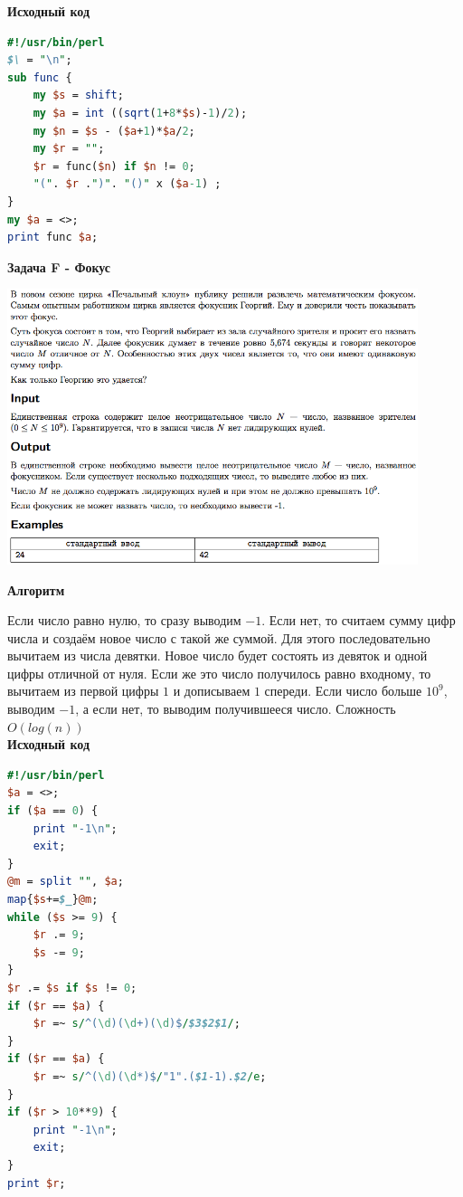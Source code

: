 \documentclass[a4paper,12pt]{article}
\begin{document}
\textbf{{\large Исходный код}} \\
\begin{lstlisting}[language=Perl]
#!/usr/bin/perl
$\ = "\n";
sub func {
	my $s = shift;
	my $a = int ((sqrt(1+8*$s)-1)/2);
	my $n = $s - ($a+1)*$a/2;
	my $r = "";
	$r = func($n) if $n != 0;
	"(". $r .")". "()" x ($a-1) ;
}
my $a = <>;
print func $a;
\end{lstlisting}

\newpage
\textbf{{\large Задача F - Фокус}}

\begin{center}
\includegraphics[width=0.9\textwidth]{OC_Ural/OC_Ural_F.png}\\ [1cm]
\end{center}
\newpage

\textbf{{\large Алгоритм}}

Если число равно нулю, то сразу выводим $-1$. Если нет, то считаем сумму цифр числа и создаём новое число с такой же суммой. Для этого последовательно вычитаем из числа девятки. Новое число будет состоять из девяток и одной цифры отличной от нуля. Если же это число получилось равно входному, то вычитаем из первой цифры $1$ и дописываем $1$ спереди. Если число больше $10^9$, выводим $-1$, а если нет, то выводим получившееся число.  Сложность $O(log(n))$\\

\textbf{{\large Исходный код}} \\
\begin{lstlisting}[language=Perl]
#!/usr/bin/perl
$a = <>;
if ($a == 0) {
	print "-1\n";
	exit;
}
@m = split "", $a;
map{$s+=$_}@m;
while ($s >= 9) {
	$r .= 9;
	$s -= 9;
}
$r .= $s if $s != 0;
if ($r == $a) {
	$r =~ s/^(\d)(\d+)(\d)$/$3$2$1/;
}
if ($r == $a) {
	$r =~ s/^(\d)(\d*)$/"1".($1-1).$2/e;
}
if ($r > 10**9) {
	print "-1\n";
	exit;
}
print $r;
\end{lstlisting}
\end{document}
